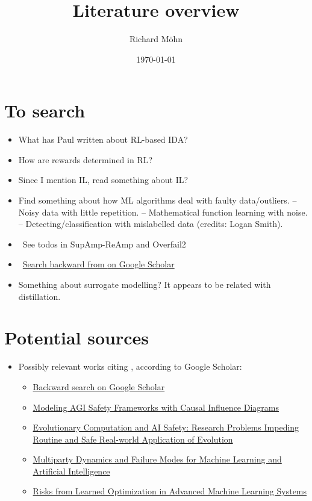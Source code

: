 \documentclass{farlamp}
\author{Richard Möhn}
\date{\today}
\title{Literature overview}
\begin{document}
\maketitle
\tableofcontents

\section{To search}

\begin{itemize}
    \item What has Paul written about RL-based IDA?
    \item How are rewards determined in RL?
    \item Since I mention IL, read something about IL?
    \item Find something about how ML algorithms deal with faulty
        data/outliers. – Noisy data with little repetition. – Mathematical
        function learning with noise. – Detecting/classification with
        mislabelled data (credits: Logan Smith).
    \item \done\ See todos in SupAmp-ReAmp and Overfail2
    \item \done\ \href{https://scholar.google.com/scholar?hl=en&as_sdt=0%2C5&q=supervising+strong+learners+by+amplifying+weak+experts&btnG=}{Search
        backward from \textcite{CSASupAmp} on Google Scholar}
    \item Something about surrogate modelling? It appears to be related with
        distillation.
\end{itemize}


\section{Potential sources}

\begin{itemize}
    \item Possibly relevant works citing \textcite{CSASupAmp}, according to
        Google Scholar:
        \begin{itemize}
            \item \href{https://scholar.google.com/scholar?hl=en&as_sdt=0%2C5&q=supervising+strong+learners+by+amplifying+weak+experts&btnG=}{Backward search on Google Scholar}
            \item \href{https://arxiv.org/abs/1906.08663}{Modeling AGI Safety Frameworks
                with Causal Influence Diagrams}
            \item \href{https://arxiv.org/abs/1906.10189}{Evolutionary
                Computation and AI Safety: Research Problems Impeding Routine
                and Safe Real-world Application of Evolution}
            \item \href{https://www.mdpi.com/2504-2289/3/2/21}{Multiparty
                Dynamics and Failure Modes for Machine Learning and Artificial
                Intelligence}
            \item \href{https://arxiv.org/abs/1906.01820}{Risks from Learned Optimization in Advanced Machine Learning Systems}
        \end{itemize}
\end{itemize}
\end{document}
